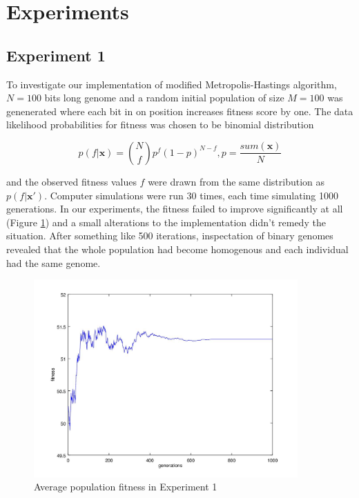 \documentclass{article}
\begin{document}
\section{Experiments} \label{experiments}

\subsection{Experiment 1}

To investigate our implementation of modified Metropolis-Hastings algorithm, $N=100$ bits long genome and a random initial population of size $M=100$ was genenerated where each bit in on position increases fitness score by one. The data likelihood probabilities for fitness was chosen to be binomial distribution 

\begin{equation}
  p(f|\mathbf{x}) = \binom{N}{f} p^{f}(1-p)^{N-f}, p = \frac{sum(\mathbf{x})}{N}
\end{equation}

and the observed fitness values $f$ were drawn from the same distribution as $p(f|\mathbf{x}')$. Computer simulations were run 30 times, each time simulating 1000 generations. In our experiments, the fitness failed to improve significantly at all (Figure \ref{fig:experiment1f3}) and a small alterations to the implementation didn't remedy the situation. After something like 500 iterations, inspectation of binary genomes revealed that the whole population had become homogenous and each individual had the same genome.

\begin{figure}

\centering
\includegraphics[keepaspectratio,width=0.9\textwidth]{experiment1figure3.jpg}

\caption{Average population fitness in Experiment 1}

\label{fig:experiment1f3}

\end{figure}
\end{document}
